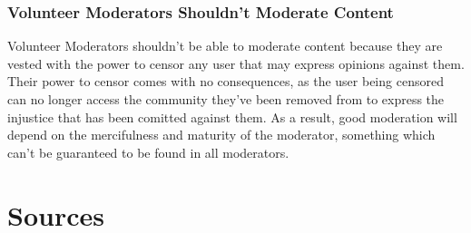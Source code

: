 \documentclass[a4paper]{article}
\begin{document}
\subsubsection{Volunteer Moderators Shouldn't Moderate Content}
Volunteer Moderators shouldn't be able to moderate content because they are vested with the power to censor any user
that may express opinions against them. Their power to censor comes with no consequences, as the user being censored
can no longer access the community they've been removed from to express the injustice that has been comitted against 
them. As a result, good moderation will depend on the mercifulness and maturity of the moderator, something which
can't be guaranteed to be found in all moderators.

\section{Sources}
\end{document}

